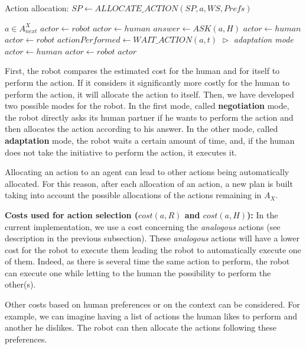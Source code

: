 \documentclass[english,a4paper,11pt,twoside]{StyleThese}
\begin{document}
\begin{algorithm}
\caption{Action allocation: $SP \leftarrow ALLOCATE\_ACTION(SP, a, WS, Prefs)$}
\label{alg:allocate}
\begin{algorithmic}
\REQUIRE $a \in A^X_{next}$
\STATE $actor \leftarrow robot$
\STATE $actor \leftarrow human$
\STATE $answer \leftarrow ASK(a, H)$
\STATE $actor \leftarrow human$
\ELSE
\STATE $actor \leftarrow robot$
\ENDIF
\ELSE
\STATE $actionPerformed \leftarrow WAIT\_ACTION(a, t)$
\hfill \textit{$\vartriangleright$ adaptation mode}
\STATE $actor \leftarrow human$
\ELSE
\STATE $actor \leftarrow robot$
\ENDIF
\ENDIF
\RETURN $actor$
\end{algorithmic}
\end{algorithm}

First, the robot compares the estimated cost for the human and for itself to perform the action. If it considers it significantly more costly for the human to perform the action, it will allocate the action to itself. Then, we have developed two possible modes for the robot. In the first mode, called \textbf{negotiation} mode, the robot directly asks its human partner if he wants to perform the action and then allocates the action according to his answer. In the other mode, called \textbf{adaptation} mode, the robot waits a certain amount of time, and, if the human does not take the initiative to perform the action, it executes it. 

Allocating an action to an agent can lead to other actions being automatically allocated. For this reason, after each allocation of an action, a new plan is built taking into account the possible allocations of the actions remaining in $A_X$.

\textbf{Costs used for action selection ($cost(a, R)$ and $cost(a, H)$):}
In the current implementation, we use a cost concerning the \textit{analogous} actions (see description in the previous subsection). These \textit{analogous} actions will have a lower cost for the robot to execute them leading the robot to automatically execute one of them. Indeed, as there is several time the same action to perform, the robot can execute one while letting to the human the possibility to perform the other(s).

Other costs based on human preferences or on the context can be considered. For example, we can imagine having a list of actions the human likes to perform and another he dislikes. The robot can then allocate the actions following these preferences.
\end{document}
